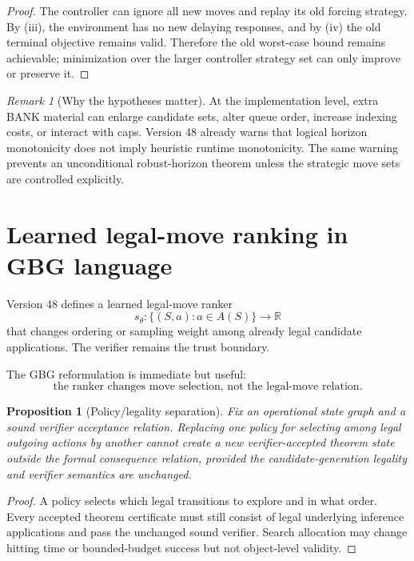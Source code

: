 \documentclass[11pt]{article}
\newtheorem{proposition}[definition]{Proposition}
\theoremstyle{remark}
\newtheorem{remark}[definition]{Remark}
\begin{document}
\begin{proof}
The controller can ignore all new moves and replay its old forcing strategy. By (iii), the environment has no new delaying responses, and by (iv) the old terminal objective remains valid. Therefore the old worst-case bound remains achievable; minimization over the larger controller strategy set can only improve or preserve it.
\end{proof}

\begin{remark}[Why the hypotheses matter]
At the implementation level, extra BANK material can enlarge candidate sets, alter queue order, increase indexing costs, or interact with caps. Version 48 already warns that logical horizon monotonicity does not imply heuristic runtime monotonicity. The same warning prevents an unconditional robust-horizon theorem unless the strategic move sets are controlled explicitly.
\end{remark}

\section{Learned legal-move ranking in GBG language}

Version 48 defines a learned legal-move ranker
\[
s_\theta:\{(S,a):a\in A(S)\}\to\mathbb R
\]
that changes ordering or sampling weight among already legal candidate applications. The verifier remains the trust boundary.

The GBG reformulation is immediate but useful:
\[
\boxed{\text{the ranker changes move selection, not the legal-move relation}.}
\]

\begin{proposition}[Policy/legality separation]
Fix an operational state graph and a sound verifier acceptance relation. Replacing one policy for selecting among legal outgoing actions by another cannot create a new verifier-accepted theorem state outside the formal consequence relation, provided the candidate-generation legality and verifier semantics are unchanged.
\end{proposition}

\begin{proof}
A policy selects which legal transitions to explore and in what order. Every accepted theorem certificate must still consist of legal underlying inference applications and pass the unchanged sound verifier. Search allocation may change hitting time or bounded-budget success but not object-level validity.
\end{proof}
\end{document}
